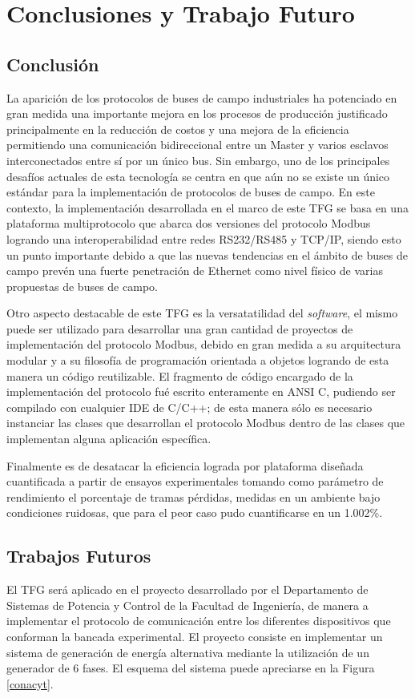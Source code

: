 \chapter[Capítulo 5. Conclusiones y Trabajo Futuro]{Conclusiones y Trabajo Futuro}
\section{Conclusión}
La aparición de los protocolos de buses de campo industriales ha potenciado en gran medida una importante mejora en los procesos de producción justificado principalmente en la reducción de costos y una mejora de la eficiencia permitiendo una comunicación bidireccional entre un Master y varios esclavos interconectados entre sí por un único bus. Sin embargo, uno de los principales desafíos actuales de esta tecnología se centra en que aún no se existe un único estándar para la implementación de protocolos de buses de campo. En este contexto, la implementación desarrollada en el marco de este TFG se basa en una plataforma multiprotocolo que abarca dos versiones del protocolo Modbus logrando una interoperabilidad entre redes RS232/RS485 y TCP/IP, siendo esto un punto importante debido a que las nuevas tendencias en el ámbito de buses de campo prevén una fuerte penetración de Ethernet como nivel físico de varias propuestas de buses de campo.

Otro aspecto destacable de este TFG es la versatatilidad  del \textit{software}, el mismo puede ser utilizado para desarrollar una gran cantidad de proyectos de implementación del protocolo Modbus, debido en gran medida a su arquitectura modular y a su filosofía de programación orientada a objetos logrando de esta manera un código reutilizable. El fragmento de código encargado de la implementación del protocolo fué escrito enteramente en ANSI C, pudiendo ser compilado con cualquier IDE  de C/C++; de esta manera sólo es necesario instanciar las clases que desarrollan el protocolo Modbus dentro de las clases que implementan alguna aplicación específica.

 
Finalmente es de desatacar la eficiencia lograda por plataforma diseñada cuantificada a partir de ensayos experimentales tomando como parámetro de rendimiento el porcentaje de tramas pérdidas, medidas en un ambiente bajo condiciones ruidosas, que para el peor caso pudo cuantificarse en un 1.002\%.

\section{Trabajos Futuros}
El TFG será aplicado en el proyecto desarrollado por el Departamento de Sistemas de Potencia y Control de la Facultad de Ingeniería, de manera a implementar el protocolo de comunicación entre los diferentes dispositivos que conforman la bancada experimental. El proyecto consiste en implementar un sistema de generación de energía alternativa mediante la utilización de un generador de 6 fases. El esquema del sistema  puede apreciarse en la Figura \ref{conacyt}.


